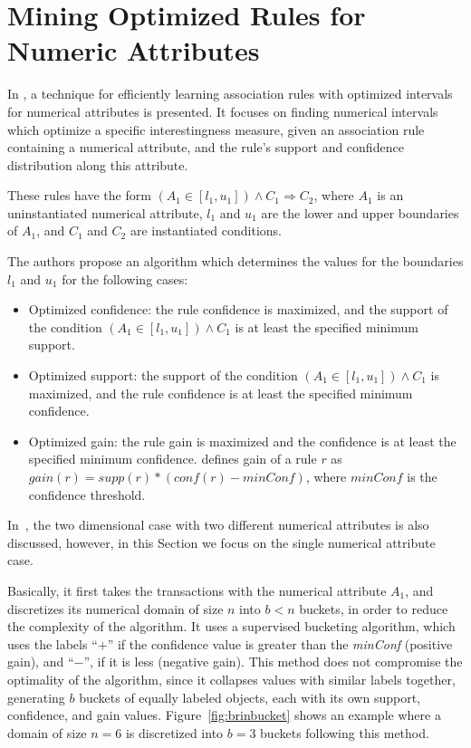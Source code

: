 \section{Mining Optimized Rules for Numeric Attributes}
\label{sec:rw-miningOptimizedRules}

In \citet{Brin99miningoptimized}, a technique for efficiently learning association rules with optimized intervals for
numerical attributes is presented. It focuses on finding numerical intervals which optimize a specific interestingness
measure, given an association rule containing a numerical attribute, and the rule's support and confidence distribution
along this attribute.

These rules have the form $(A_1 \in [l_1,u_1]) \wedge C_1 \Rightarrow C_2$, where
$A_1$ is an uninstantiated numerical attribute, $l_1$ and $u_1$ are the lower and upper boundaries of $A_1$, and $C_1$
and $C_2$ are instantiated conditions.

The authors propose an algorithm which determines the values for the boundaries $l_1$ and $u_1$ for the following cases:

\begin{itemize}
 \item Optimized confidence: the rule confidence is maximized, and the support of the condition $(A_1 \in [l_1,u_1])
\wedge
C_1$ is at least the specified minimum support.
  \item Optimized support: the support of the condition $(A_1 \in [l_1,u_1]) \wedge C_1$ is maximized, and the rule
confidence is at least the specified minimum confidence.
  \item Optimized gain: the rule gain is maximized and the confidence is at least the specified minimum confidence.
\citet{Brin99miningoptimized} defines gain of a rule $r$ as $gain(r)= supp(r)*(conf(r)-minConf)$, where $minConf$ is the
confidence threshold.
\end{itemize}

In~\citet{Brin99miningoptimized}, the two dimensional case with two different numerical attributes is also discussed,
however, in this Section we focus on the single numerical attribute case.

Basically, it first takes the transactions with the numerical attribute $A_1$, and discretizes its numerical domain of
size
$n$ into $b < n$ buckets, in order to reduce the complexity of the algorithm. It uses a supervised bucketing algorithm,
which uses the labels ``$+$'' if the confidence value is greater than the \emph{minConf} (positive gain), and ``$-$'',
if it is less (negative gain). This method does not compromise the optimality of the algorithm, since it collapses
values with similar labels together, generating $b$ buckets of equally labeled objects, each with its own
support, confidence, and gain values. Figure~\ref{fig:brinbucket} shows an example where a domain of size $n=6$ is
discretized into $b=3$ buckets following this method.

